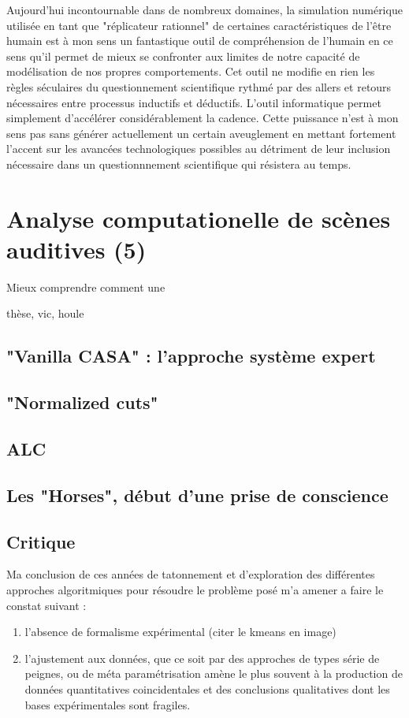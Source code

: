 Aujourd'hui incontournable dans de nombreux domaines, la simulation numérique utilisée en tant que "réplicateur rationnel" de certaines caractéristiques de l'être humain est à mon sens un fantastique outil de compréhension de l'humain en ce sens qu'il permet de mieux se confronter aux limites de notre capacité de modélisation de nos propres comportements. Cet outil ne modifie en rien les règles séculaires du questionnement scientifique rythmé par des allers et retours nécessaires entre processus inductifs et déductifs. L'outil informatique permet simplement d'accélérer considérablement la cadence. Cette puissance n'est à mon sens pas sans générer actuellement un certain aveuglement en mettant fortement l'accent sur les avancées technologiques possibles au détriment de leur inclusion nécessaire dans un questionnnement scientifique qui résistera au temps.

\section{Analyse computationelle de scènes auditives (5)}

Mieux comprendre comment une

thèse, vic, houle

\subsection{"Vanilla CASA" : l'approche système expert}

\subsection{"Normalized cuts"}

\subsection{ALC}

\subsection{Les "Horses", début d'une prise de conscience}

\subsection{Critique}

Ma conclusion de ces années de tatonnement et d'exploration des différentes approches algoritmiques pour résoudre le problème posé m'a amener a faire le constat suivant :
\begin{enumerate}
  \item l'absence de formalisme expérimental (citer le kmeans en image)
  \item l'ajustement aux données, que ce soit par des approches de types série de peignes, ou de méta paramétrisation amène le plus souvent à la production de données quantitatives coincidentales et des conclusions qualitatives dont les bases expérimentales sont fragiles.

\end{enumerate}


